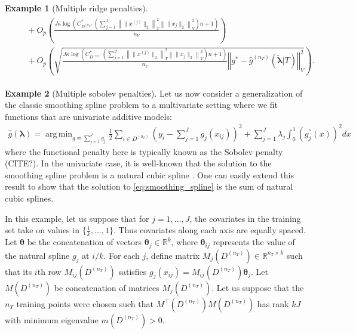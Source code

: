 \documentclass[12pt]{article} %
\theoremstyle{definition}
\newtheorem{example}{Example}
\DeclareMathOperator*{\argmin}{arg\,min}
\begin{document}
\begin{example}[Multiple ridge penalties]
\begin{align}
\begin{split}
	& \quad + O_p\left (
	\frac{J \kappa \log \left (
		C^*_{D^{(n_T)}} \left(
		\sum_{j = 1}^J \left \|\|x^{(j)} \|_2 \right \|_T^2 \left \|\|x_j\|_2 \right \|_V^2
		\right) n + 1
		\right )}{n_{V}}
	\right ) \\
	&\quad + O_p\left(
	\sqrt{\frac{J \kappa \log \left (
			C^*_{D^{(n_T)}} \left(
			\sum_{j = 1}^J \left \|\|x^{(j)} \|_2 \right \|_T^2 \left \|\|x_j\|_2 \right \|_V^2
			\right) n + 1
			\right )}{n_{V}}\left\Vert g^* - \hat{g}^{(n_T)}( \tilde{\boldsymbol{\lambda}} | T)\right\Vert_{V}^2}
	\right ).
	\end{split}
	\end{align}
\end{example}

\begin{example}[Multiple sobolev penalties]
	Let us now consider a generalization of the classic smoothing spline problem to a multivariate setting where we fit functions that are univariate additive models:
	\begin{align}
	\hat{g}(\boldsymbol{\lambda})
	= \argmin_{g \equiv \sum_{j=1}^J g_j}
	\frac{1}{2} \sum_{i\in D^{(n_T)}}
	\left(
	y_i - \sum_{j=1}^J g_j(x_{ij})
	\right)^2
	+ \sum_{j=1}^{J} \lambda_j \int_0^1 \left(g_j^{''}(x)\right)^{2} dx
	\label{eq:smoothing_spline}
	\end{align}
	where the functional penalty here is typically known as the Sobolev penalty (CITE?).
	In the univariate case, it is well-known that the solution to the smoothing spline problem is a natural cubic spline \citep{green1993nonparametric}.
	One can easily extend this result to show that the solution to \eqref{eq:smoothing_spline} is the sum of natural cubic splines.
	
	In this example, let us suppose that for $j = 1,...,J$, the covariates in the training set take on values in $\{\frac{1}{k}, ..., 1\}$.
	Thus covariates along each axis are equally spaced.
	Let $\boldsymbol{\theta}$ be the concatenation of vectors $\boldsymbol{\theta}_j \in \mathbb{R}^{k}$, where $\boldsymbol{\theta}_{ij}$ represents the value of the natural spline $g_j$ at $i/k$.
	For each $j$, define matrix $M_{j}(D^{(n_T)}) \in \mathbb{R}^{n_T \times k}$ such that its $i$th row $M_{ij}(D^{(n_T)})$ satisfies $g_j(x_{ij}) = M_{ij}(D^{(n_T)}) \boldsymbol{\theta}_j$.
	Let $M(D^{(n_T)})$ be concatenation of matrices $M_{j}(D^{(n_T)})$.
	Let us suppose that the $n_T$ training points were chosen such that $M^\top(D^{(n_T)})M(D^{(n_T)})$ has rank $kJ$ with minimum eigenvalue $m(D^{(n_T)}) >0$.
	

\end{example}
\end{document}
